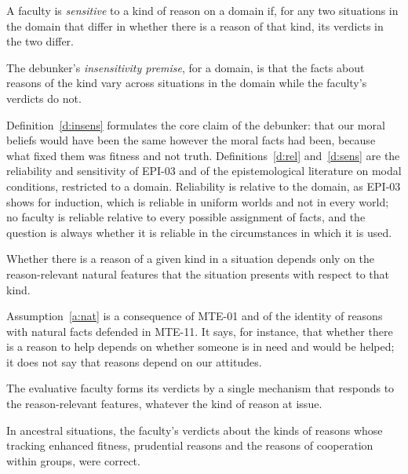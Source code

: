 \documentclass{situationist-preprint}
\begin{document}
\begin{definition}[Sensitivity]\label{d:sens}
A faculty is \emph{sensitive} to a kind of reason on a domain if, for any two situations in the domain that differ in whether there is a reason of that kind, its verdicts in the two differ.
\end{definition}

\begin{definition}[Insensitivity]\label{d:insens}
The debunker's \emph{insensitivity premise}, for a domain, is that the facts about reasons of the kind vary across situations in the domain while the faculty's verdicts do not.
\end{definition}

Definition~\ref{d:insens} formulates the core claim of the debunker: that our moral beliefs would have been the same however the moral facts had been, because what fixed them was fitness and not truth. Definitions~\ref{d:rel} and~\ref{d:sens} are the reliability and sensitivity of EPI-03 and of the epistemological literature on modal conditions, restricted to a domain. Reliability is relative to the domain, as EPI-03 shows for induction, which is reliable in uniform worlds and not in every world; no faculty is reliable relative to every possible assignment of facts, and the question is always whether it is reliable in the circumstances in which it is used.

\begin{assumption}[Naturalism]\label{a:nat}
Whether there is a reason of a given kind in a situation depends only on the reason-relevant natural features that the situation presents with respect to that kind.
\end{assumption}

Assumption~\ref{a:nat} is a consequence of MTE-01 and of the identity of reasons with natural facts defended in MTE-11. It says, for instance, that whether there is a reason to help depends on whether someone is in need and would be helped; it does not say that reasons depend on our attitudes.

\begin{assumption}\label{a:unity}
The evaluative faculty forms its verdicts by a single mechanism that responds to the reason-relevant features, whatever the kind of reason at issue.
\end{assumption}

\begin{assumption}\label{a:sel}
In ancestral situations, the faculty's verdicts about the kinds of reasons whose tracking enhanced fitness, prudential reasons and the reasons of cooperation within groups, were correct.
\end{assumption}
\end{document}
